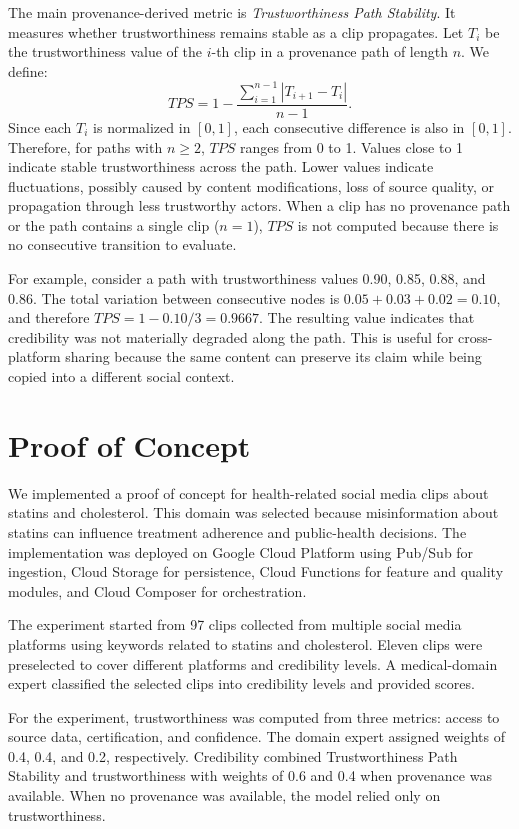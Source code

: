 \documentclass[sigconf, nonacm]{acmart}
\begin{document}
The main provenance-derived metric is \emph{Trustworthiness Path Stability}. It
measures whether trustworthiness remains stable as a clip propagates. Let
$T_i$ be the trustworthiness value of the $i$-th clip in a provenance path of
length $n$. We define:
\begin{equation}
  TPS = 1 - \frac{\sum_{i=1}^{n-1}|T_{i+1}-T_i|}{n-1}.
\end{equation}
Since each $T_i$ is normalized in $[0,1]$, each consecutive difference is also in
$[0,1]$. Therefore, for paths with $n \geq 2$, $TPS$ ranges from 0 to 1. Values
close to 1 indicate stable trustworthiness across the path. Lower values indicate
fluctuations, possibly caused by content modifications, loss of source quality, or
propagation through less trustworthy actors. When a clip has no provenance path
or the path contains a single clip ($n=1$), $TPS$ is not computed because there is
no consecutive transition to evaluate.

For example, consider a path with trustworthiness values 0.90, 0.85, 0.88, and
0.86. The total variation between consecutive nodes is
$0.05+0.03+0.02=0.10$, and therefore $TPS=1-0.10/3=0.9667$. The resulting value
indicates that credibility was not materially degraded along the path. This is
useful for cross-platform sharing because the same content can preserve its claim
while being copied into a different social context.

\section{Proof of Concept}

We implemented a proof of concept for health-related social media clips about
statins and cholesterol. This domain was selected because misinformation about
statins can influence treatment adherence and public-health decisions. The
implementation was deployed on Google Cloud Platform using Pub/Sub for ingestion,
Cloud Storage for persistence, Cloud Functions for feature and quality modules,
and Cloud Composer for orchestration.

The experiment started from 97 clips collected from multiple social media
platforms using keywords related to statins and cholesterol. Eleven clips were
preselected to cover different platforms and credibility levels. A medical-domain
expert classified the selected clips into credibility levels and provided scores.

For the experiment, trustworthiness was computed from three metrics: access to
source data, certification, and confidence. The domain expert assigned weights of
0.4, 0.4, and 0.2, respectively. Credibility combined Trustworthiness Path
Stability and trustworthiness with weights of 0.6 and 0.4 when provenance was
available. When no provenance was available, the model relied only on
trustworthiness.
\end{document}
